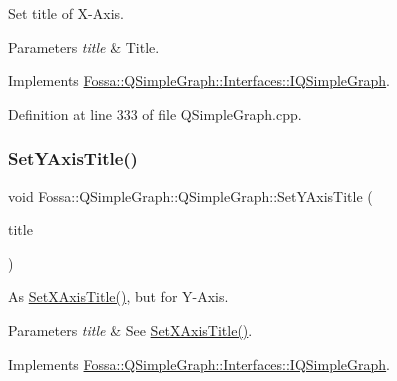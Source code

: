 Set title of X-\/\+Axis. 


\begin{DoxyParams}{Parameters}
{\em title} & Title. \\
\hline
\end{DoxyParams}


Implements \hyperlink{class_fossa_1_1_q_simple_graph_1_1_interfaces_1_1_i_q_simple_graph_adfca7d41a47790e8403507544468ba86}{Fossa\+::\+Q\+Simple\+Graph\+::\+Interfaces\+::\+I\+Q\+Simple\+Graph}.



Definition at line 333 of file Q\+Simple\+Graph.\+cpp.

\mbox{\label{class_fossa_1_1_q_simple_graph_1_1_q_simple_graph_a41c9e9d34744f6e6550ca97dc0d2f488}} 
\subsubsection{\texorpdfstring{Set\+Y\+Axis\+Title()}{SetYAxisTitle()}}
{\footnotesize\ttfamily void Fossa\+::\+Q\+Simple\+Graph\+::\+Q\+Simple\+Graph\+::\+Set\+Y\+Axis\+Title (\begin{DoxyParamCaption}\item[{Q\+String}]{title }\end{DoxyParamCaption})\hspace{0.3cm}{\ttfamily [virtual]}}



As \hyperlink{class_fossa_1_1_q_simple_graph_1_1_q_simple_graph_a7579da572b54d43ccec3d2bd572b6cfa}{Set\+X\+Axis\+Title()}, but for Y-\/\+Axis. 


\begin{DoxyParams}{Parameters}
{\em title} & See \hyperlink{class_fossa_1_1_q_simple_graph_1_1_q_simple_graph_a7579da572b54d43ccec3d2bd572b6cfa}{Set\+X\+Axis\+Title()}. \\
\hline
\end{DoxyParams}


Implements \hyperlink{class_fossa_1_1_q_simple_graph_1_1_interfaces_1_1_i_q_simple_graph_a606c07c40ed294cdd568de5488875af5}{Fossa\+::\+Q\+Simple\+Graph\+::\+Interfaces\+::\+I\+Q\+Simple\+Graph}.



